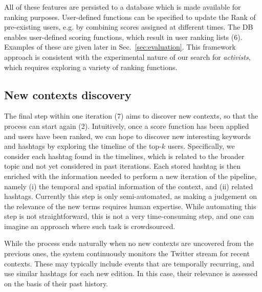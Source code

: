 All of these features are persisted to a database which is made available for ranking purposes.
User-defined functions can be specified to update the Rank of pre-existing users, e.g. by combining scores assigned at different times.
%
The DB enables user-defined scoring functions, which result in user ranking lists (6). Examples of these are given later in Sec.~\ref{sec:evaluation}.
This framework approach is consistent with the experimental nature of our search for \textit{activists}, which requires exploring a variety of ranking functions.

\subsection{New contexts discovery} \label{sec:context-discovery}

The final step within one iteration (7) aims to discover new contexts, so that the process can start again (2).
Intuitively, once a score function has been applied and users have been ranked, we can hope to discover new interesting keywords and hashtags by exploring the timeline of the top-$k$ users.
Specifically,  we consider each hashtag found in the timelines, which is related to the broader topic and not yet considered in past iterations.
Each stored hashtag is then enriched with the information needed to perform a new iteration of the pipeline, namely (i) the temporal and spatial information of the context, and (ii) related hashtags.
%
Currently this step is only semi-automated, as making a judgement on the relevance of the new terms requires  human expertise.
While automating this step is not straightforward, this is not a very time-consuming step, and one can imagine an approach where such task is crowdsourced.

While the process ends naturally when no new contexts are uncovered from the previous ones, the system continuously monitors the Twitter stream for recent contexts. These may typically include events that are temporally recurring, and use similar hashtags for each new edition. In this case, their relevance is assessed on the basis of their past history.